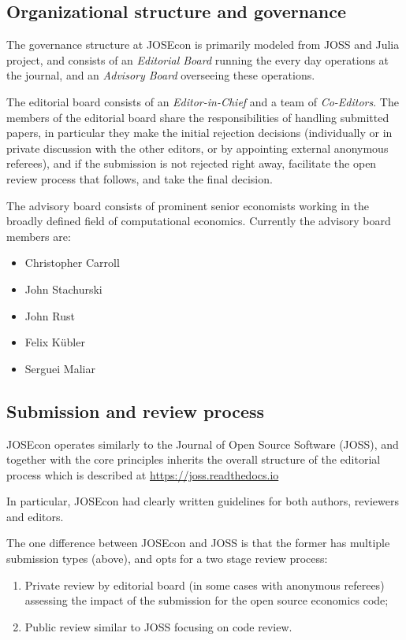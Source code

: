
\subsection{Organizational structure and governance}

The governance structure at JOSEcon is primarily modeled from JOSS and Julia project,
and consists of an \emph{Editorial Board} running the every day operations at the 
journal, and an \emph{Advisory Board} overseeing these operations.

The editorial board consists of an \emph{Editor-in-Chief} and a team of \emph{Co-Editors}.
The members of the editorial board share the responsibilities of handling submitted papers, 
in particular they make the initial rejection decisions (individually or in private discussion
with the other editors, or by appointing external anonymous referees), 
and if the submission is not rejected right away, facilitate the open review process that
follows, and take the final decision.

The advisory board consists of prominent senior economists working in the broadly 
defined field of computational economics.  Currently the advisory board members are:
\begin{itemize}
\item Christopher Carroll
\item John Stachurski
\item John Rust
\item Felix K\"{u}bler
\item Serguei Maliar    
\end{itemize}


\subsection{Submission and review process}

JOSEcon operates similarly to the Journal of Open Source Software (JOSS), and together
with the core principles inherits the overall structure of the editorial process
which is described at \url{https://joss.readthedocs.io}

In particular, JOSEcon had clearly written guidelines for both authors, reviewers and editors.

The one difference between JOSEcon and JOSS is that the former has multiple 
submission types (above), and opts for a two stage review process:
\begin{enumerate}
\item Private review by editorial board (in some cases with anonymous referees) assessing 
the impact of the submission for the open source economics code;
\item Public review similar to JOSS focusing on code review.
\end{enumerate}

